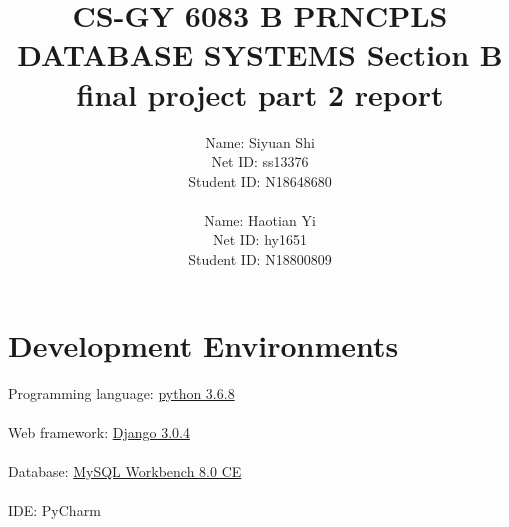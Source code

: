 \documentclass[12pt]{article}
\begin{document}
	\title{CS-GY 6083 B PRNCPLS DATABASE SYSTEMS Section B final project part 2 report}
	\author{Name: Siyuan Shi\\
			Net ID: ss13376\\
			Student ID: N18648680\\
			 \\
			Name: Haotian Yi\\
			Net ID: hy1651 \\
			Student ID: N18800809\\
			}
	\maketitle
	

	\newpage
	
	\section{Development Environments}
	Programming language: \href{https://www.python.org/downloads/release/python-368/}{python 3.6.8}\\
	 \\
	Web framework: \href{https://www.djangoproject.com/download/}{Django 3.0.4}\\
	 \\
	Database: \href{https://www.mysql.com/products/workbench/}{MySQL Workbench 8.0 CE}\\
	 \\
	IDE: PyCharm
	
\end{document}
